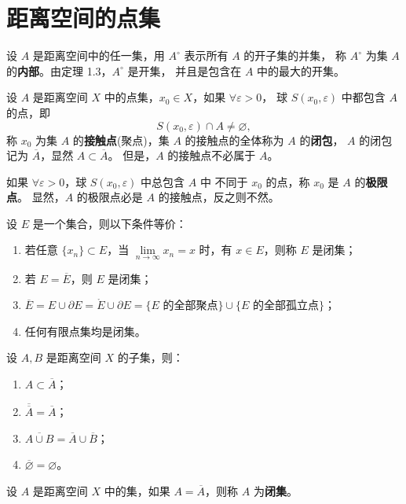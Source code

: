 \section{距离空间的点集}
\begin{proposition}
    

设 $A$ 是距离空间中的任一集，用 $A^{\circ}$ 表示所有 $A$ 的开子集的并集，
称 $A^{\circ}$ 为集 $A$ 的\textbf{内部}。由定理 1.3，$A^{\circ}$ 是开集，
并且是包含在 $A$ 中的最大的开集。

设 $A$ 是距离空间 $X$ 中的点集，$x_0 \in X$，如果 $\forall \varepsilon >0$，
球 $S(x_0,\varepsilon)$ 中都包含 $A$ 的点，即
\[
S(x_0,\varepsilon) \cap A \neq \varnothing,
\]
称 $x_0$ 为集 $A$ 的\textbf{接触点}(聚点)，集 $A$ 的接触点的全体称为 $A$ 的\textbf{闭包}，
$A$ 的闭包记为 $\overline{A}$，显然 $A \subset \overline{A}$。
但是，$A$ 的接触点不必属于 $A$。

如果 $\forall \varepsilon > 0$，球 $S(x_0,\varepsilon)$ 中总包含 $A$ 中
不同于 $x_0$ 的点，称 $x_0$ 是 $A$ 的\textbf{极限点}。
显然，$A$ 的极限点必是 $A$ 的接触点，反之则不然。
\end{proposition}
\begin{proposition}[闭集的刻画]
设 $E$ 是一个集合，则以下条件等价：
\begin{enumerate}
  \item 若任意 $\{x_n\} \subset E$，当 $\lim\limits_{n \to \infty} x_n = x$ 时，有 $x \in E$，则称 $E$ 是闭集；
  \item 若 $E = \overline{E}$，则 $E$ 是闭集；
  \item $\overline{E} = E \cup \partial E = \mathring{E} \cup \partial E = \{E \text{ 的全部聚点}\} \cup \{E \text{ 的全部孤立点}\}$；
  \item 任何有限点集均是闭集。
\end{enumerate}
\end{proposition}
\begin{theorem}[集A和闭包的关系]
设 $A,B$ 是距离空间 $X$ 的子集，则：
\begin{enumerate}
  \item $A \subset \overline{A}$；
  \item $\overline{\overline{A}} = \overline{A}$；
  \item $\overline{A \cup B} = \overline{A} \cup \overline{B}$；
  \item $\overline{\varnothing} = \varnothing$。
\end{enumerate}
\end{theorem}
设 $A$ 是距离空间 $X$ 中的集，如果 $A = \overline{A}$，则称 $A$ 为\textbf{闭集}。

